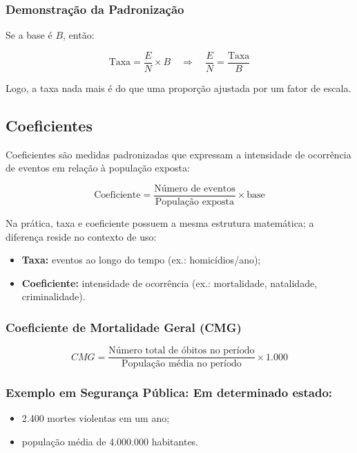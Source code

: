 \subsubsection*{Demonstração da Padronização}

Se a base é $B$, então:

\[
\text{Taxa} = \frac{E}{N} \times B
\quad \Rightarrow \quad
\frac{E}{N} = \frac{\text{Taxa}}{B}
\]

Logo, a taxa nada mais é do que uma proporção ajustada por um fator de escala.

\subsection{Coeficientes}

Coeficientes são medidas padronizadas que expressam a intensidade de ocorrência de eventos em relação à população exposta:

\[
\text{Coeficiente} = \frac{\text{Número de eventos}}{\text{População exposta}} \times \text{base}
\]

Na prática, taxa e coeficiente possuem a mesma estrutura matemática; a diferença reside no contexto de uso:

\begin{itemize}
\item \textbf{Taxa:} eventos ao longo do tempo (ex.: homicídios/ano);  
\item \textbf{Coeficiente:} intensidade de ocorrência (ex.: mortalidade, natalidade, criminalidade).
\end{itemize}

\subsubsection{Coeficiente de Mortalidade Geral (CMG)}

\[
CMG = \frac{\text{Número total de óbitos no período}}{\text{População média no período}} \times 1.000
\]

\subsubsection*{Exemplo em Segurança Pública: Em determinado estado:}

\begin{itemize}
\item 2.400 mortes violentas em um ano;
\item população média de 4.000.000 habitantes.
\end{itemize}

